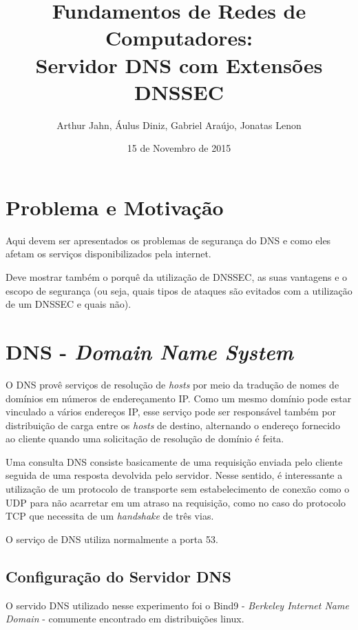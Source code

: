 \documentclass[a4paper]{report} %
\title{Fundamentos de Redes de Computadores: \\ Servidor DNS com Extensões DNSSEC}
\author{Arthur Jahn, Áulus Diniz, Gabriel Araújo, Jonatas Lenon}
\date{15 de Novembro de 2015}    %
\begin{document}
\maketitle  %

\tableofcontents %
\chapter{Problema e Motivação}
\label{chap_problema}

Aqui devem ser apresentados os problemas de segurança do DNS e como eles afetam os serviços disponibilizados pela internet.

Deve mostrar também o porquê da utilização de DNSSEC, as suas vantagens e o escopo de segurança (ou seja, quais tipos de ataques são evitados com a utilização de um DNSSEC e quais não).

\chapter{DNS  - \textit{Domain Name System}}
\label{chap_dns}

O DNS provê serviços de resolução de \textit{hosts} por meio da tradução de nomes de domínios em números de endereçamento IP. Como um mesmo domínio pode estar vinculado a vários endereços IP, esse serviço pode ser responsável também por distribuição de carga entre os \textit{hosts} de destino, alternando o endereço fornecido ao cliente quando uma solicitação de resolução de domínio é feita.

Uma consulta DNS consiste basicamente de uma requisição enviada pelo cliente seguida de uma resposta devolvida pelo servidor. Nesse sentido, é interessante a utilização de um protocolo de transporte sem estabelecimento de conexão como o UDP para não acarretar em um atraso na requisição, como no caso do protocolo TCP que necessita de um \textit{handshake} de três vias.

O serviço de DNS utiliza normalmente a porta 53.

\section{Configuração do Servidor DNS}
\label{sec_configuracao}

O servido DNS utilizado nesse experimento foi o Bind9 - \textit{Berkeley Internet Name Domain} - comumente encontrado em distribuições linux.
\end{document}
